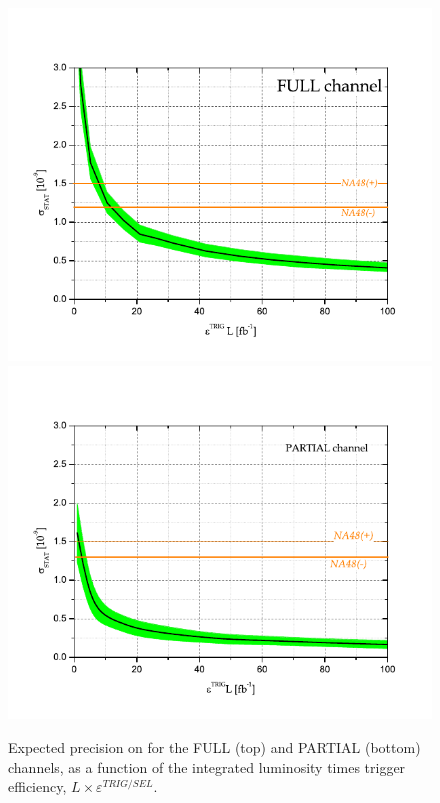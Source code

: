 \begin{figure} [htb!]
\begin{center}
\includegraphics[scale=0.80]{figs/Kspi0MuMu/sensit_FULL.pdf}%
\includegraphics[scale=0.80]{figs/Kspi0MuMu/sensitPARTIAL.pdf}
\caption{Expected precision on \BRof\Kspizmm for the FULL (top) and PARTIAL (bottom) channels, as a function of the integrated luminosity times trigger efficiency, $L\times\varepsilon^{TRIG/SEL}$. \label{fig:sensitivity}}
\end{center}
\end{figure}


